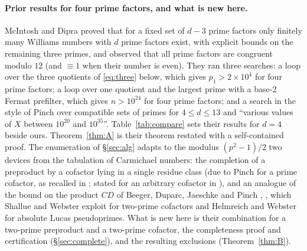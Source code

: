 \documentclass[11pt]{amsart}
\theoremstyle{definition}
\theoremstyle{remark}
\begin{document}
\paragraph{Prior results for four prime factors, and what is new here.} McIntosh and Dipra \cite{MD15} proved that for a fixed set of $d-3$ prime factors only finitely many Williams numbers with $d$ prime factors exist, with explicit bounds on the remaining three primes, and observed that all prime factors are congruent modulo $12$ (and $\equiv1$ when their number is even). They ran three searches: a loop over the three quotients of \eqref{eq:three} below, which gives $p_1>2\times10^4$ for four prime factors; a loop over one quotient and the largest prime with a base-$2$ Fermat prefilter, which gives $n>10^{24}$ for four prime factors; and a search in the style of Pinch over compatible sets of primes for $4\le d\le13$ and ``various values of $X$ between $10^{20}$ and $10^{35}$''. Table~\ref{tab:compare} sets their results for $d=4$ beside ours. Theorem~\ref{thm:A} is their theorem restated with a self-contained proof. The enumeration of \S\ref{sec:alg} adapts to the modulus $(p^2-1)/2$ two devices from the tabulation of Carmichael numbers: the completion of a preproduct by a cofactor lying in a single residue class (due to Pinch \cite{Pinch93} for a prime cofactor, as recalled in \cite{SW22}; stated for an arbitrary cofactor in \cite[\S2]{SW25}), and an analogue of the bound on the product $CD$ of Beeger, Duparc, Jaeschke and Pinch \cite{Pinch93}, \cite[Thm.~8]{SW25}, which Shallue and Webster \cite{SW22} exploit for two-prime cofactors and Helmreich and Webster \cite{HW24} for absolute Lucas pseudoprimes. What is new here is their combination for a two-prime preproduct and a two-prime cofactor, the completeness proof and certification (\S\ref{sec:complete}), and the resulting exclusions (Theorem~\ref{thm:B}).
\end{document}
